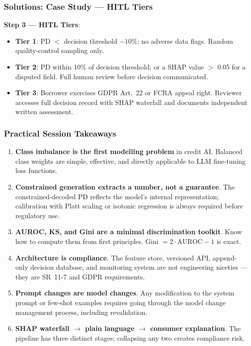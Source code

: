 \documentclass[9pt,t]{beamer}
\begin{document}
\begin{frame}
\frametitle{Solutions: Case Study --- HITL Tiers}

\textbf{Step 3 — HITL Tiers}:
\begin{itemize}
  \item \textbf{Tier 1}: PD $<$ decision threshold $- 10\%$; no adverse data flags. Random quality-control sampling only.
  \item \textbf{Tier 2}: PD within 10\% of decision threshold; or a SHAP value $>$ 0.05 for a disputed field. Full human review before decision communicated.
  \item \textbf{Tier 3}: Borrower exercises GDPR Art.~22 or FCRA appeal right. Reviewer accesses full decision record with SHAP waterfall and documents independent written assessment.
\end{itemize}
\end{frame}

\begin{frame}
\frametitle{Practical Session Takeaways}

\begin{enumerate}
  \item \textbf{Class imbalance is the first modelling problem} in credit AI. Balanced class weights are simple, effective, and directly applicable to LLM fine-tuning loss functions.

  \item \textbf{Constrained generation extracts a number, not a guarantee}. The constrained-decoded PD reflects the model's internal representation; calibration with Platt scaling or isotonic regression is always required before regulatory use.

  \item \textbf{AUROC, KS, and Gini are a minimal discrimination toolkit}. Know how to compute them from first principles. Gini $= 2 \cdot \text{AUROC} - 1$ is exact.

  \item \textbf{Architecture is compliance}. The feature store, versioned API, append-only decision database, and monitoring system are not engineering niceties — they are SR~11-7 and GDPR requirements.

  \item \textbf{Prompt changes are model changes}. Any modification to the system prompt or few-shot examples requires going through the model change management process, including revalidation.

  \item \textbf{SHAP waterfall $\to$ plain language $\to$ consumer explanation}. The pipeline has three distinct stages; collapsing any two creates compliance risk.
\end{enumerate}
\end{frame}
\end{document}

